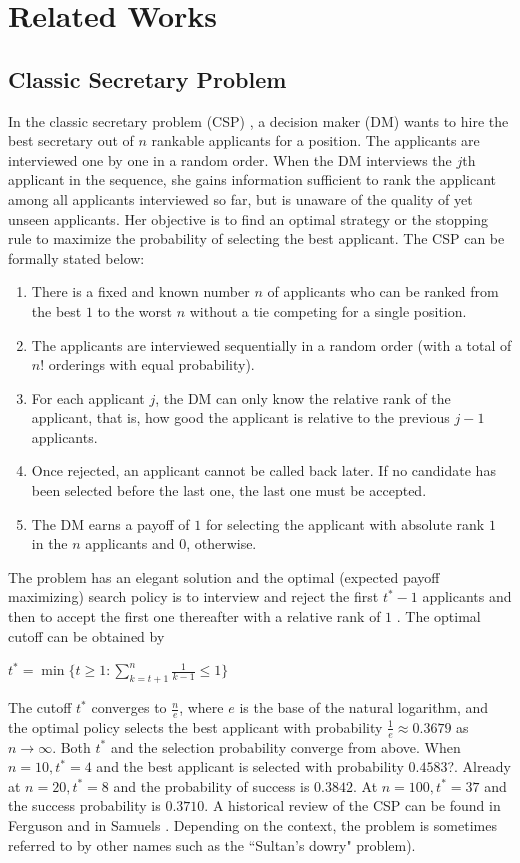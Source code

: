 \documentclass[conference]{IEEEtran}
\theoremstyle{definition}
\begin{document}
\section{Related Works} \label{sec:related}
\subsection{Classic Secretary Problem}
In the classic secretary problem (CSP) \cite{CSP}, a decision maker (DM) wants to hire the best secretary out of $n$ rankable applicants for a position. The applicants are interviewed one by one in a random order.  When the DM interviews the $j$th applicant in the sequence, she gains information sufficient to rank the applicant among all applicants interviewed so far, but is unaware of the quality of yet unseen applicants.   Her objective is to find an optimal strategy or the stopping rule to maximize the probability of selecting the best applicant. The CSP can be formally stated below:

\begin{enumerate}
\item  There is a fixed and known number $n$ of applicants who can be ranked from the best $1$ to the worst $n$ without a tie competing for a single position.
\item The applicants are interviewed sequentially in a random order (with a total of $n!$ orderings with equal probability).
\item For each applicant $j$, the DM can only know the relative rank of the applicant, that is, how good the applicant is relative to the previous $j-1$ applicants.
\item Once rejected, an applicant cannot be called back later. If no candidate has been selected before the last one, the last one must be accepted.
\item The DM earns a payoff of $1$ for selecting the applicant with absolute rank $1$ in the $n$ applicants and $0$, otherwise.
\end{enumerate}


The problem has an elegant solution and the optimal (expected payoff maximizing) search policy is to interview and reject the first $t^{*}-1$ applicants and then to accept the first one thereafter with a relative rank of $1$ \cite{Gilbert1966}. The optimal cutoff can be obtained by

$t^{*} = \min \{t \geq 1: \sum_{k=t+1}^{n} \frac{1}{k-1} \leq 1\} $

The cutoff $t^{*}$ converges to $\frac {n}{e}$, where $e$ is the base of the natural logarithm, and the optimal policy selects the best applicant with probability $\frac {1} {e} \approx 0.3679$ as $n \rightarrow \infty$. Both $t^{*}$ and the selection probability converge from above. When $n=10, t^{*}=4$ and the best applicant is selected with probability $0.4583$?. Already at $n=20, t^{*}=8$ and the probability of success is $0.3842$. At $n=100, t^{*}=37$ and the success probability is $0.3710$. A historical review of the CSP can be found in Ferguson \cite{Ferguson1989} and in Samuels \cite{Samuels1992}. Depending on the context, the problem is sometimes referred to by other names such as the ``Sultan’s dowry" problem).
\end{document}
